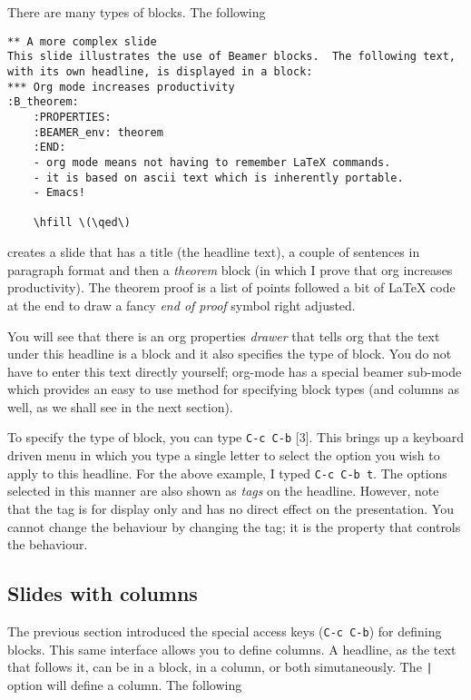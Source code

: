 \documentclass[presentation]{beamer}
\begin{document}
There are many types of blocks.  The following

\begin{verbatim}
** A more complex slide
This slide illustrates the use of Beamer blocks.  The following text,
with its own headline, is displayed in a block:
*** Org mode increases productivity                               :B_theorem:
    :PROPERTIES:
    :BEAMER_env: theorem
    :END:
    - org mode means not having to remember LaTeX commands.
    - it is based on ascii text which is inherently portable.
    - Emacs!

    \hfill \(\qed\)
\end{verbatim}

creates a slide that has a title (the headline text), a couple of
sentences in paragraph format and then a \emph{theorem} block (in which I
prove that org increases productivity).  The theorem proof is a list
of points followed a bit of \LaTeX{} code at the end to draw a fancy
\emph{end of proof} symbol right adjusted.

You will see that there is an org properties \emph{drawer} that tells org
that the text under this headline is a block and it also specifies the
type of block.  You do not have to enter this text directly yourself;
org-mode has a special beamer sub-mode which provides an easy to use
method for specifying block types (and columns as well, as we shall
see in the next section).

To specify the type of block, you can type \texttt{C-c C-b} [3].  This brings up
a keyboard driven menu in which you type a single letter to select the
option you wish to apply to this headline.  For the above example, I
typed \texttt{C-c C-b t}.  The options selected in this manner are also shown
as \emph{tags} on the headline.  However, note that the tag is for display
only and has no direct effect on the presentation.  You cannot change
the behaviour by changing the tag; it is the property that controls
the behaviour.

\subsection{Slides with columns}
\label{sec:org41b12e4}

The previous section introduced the special access keys (\texttt{C-c C-b})
for defining blocks.  This same interface allows you to define
columns.  A headline, as the text that follows it, can be in a block,
in a column, or both simutaneously.  The \texttt{|} option will define a
column.  The following
\end{document}
